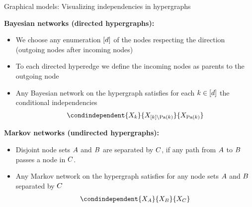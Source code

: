 \documentclass{beamer}
\begin{document}
    \begin{frame}{Graphical models: Visualizing independencies in hypergraphs}

        {\bf Bayesian networks (directed hypergraphs):}
        \begin{itemize}
            \item We choose any enumeration $[d]$ of the nodes respecting the direction (outgoing nodes after incoming nodes)
            \item To each directed hyperedge we define the incoming nodes as parents to the outgoing node
            \item Any Bayesian network on the hypergraph satisfies for each $k\in[d]$ the conditional independencies
            \begin{align*}
                \condindependent{\catvariableof{\catenumerator}}{\catvariableof{[\catenumerator]\backslash\parentsof{\catenumerator}}}{\catvariableof{\parentsof{\catenumerator}}}
            \end{align*}
        \end{itemize}
            {\bf Markov networks (undirected hypergraphs):}
        \begin{itemize}
            \item Disjoint node sets $A$ and $B$ are separated by $C$, if any path from $A$ to $B$ passes a node in $C$.
            \item Any Markov network on the hypergraph satisfies for any node sets $A$ and $B$ separated by $C$
            \begin{align*}
                \condindependent{\catvariableof{\nodesa}}{\catvariableof{\nodesb}}{\catvariableof{\nodesc}}
            \end{align*}
        \end{itemize}
    \end{frame}
\end{document}
